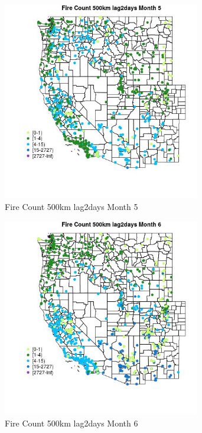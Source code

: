 \begin{figure} 
\centering  
\includegraphics[width=0.77\textwidth]{Code_Outputs/Report_ML_input_PM25_Step4_part_f_de_duplicated_aveswNAs_MapObsMo5Fire_Count_500km_lag2days.jpg} 
\caption{\label{fig:Report_ML_input_PM25_Step4_part_f_de_duplicated_aveswNAsMapObsMo5Fire_Count_500km_lag2days}Fire Count 500km lag2days Month 5} 
\end{figure} 
 

\clearpage 

\begin{figure} 
\centering  
\includegraphics[width=0.77\textwidth]{Code_Outputs/Report_ML_input_PM25_Step4_part_f_de_duplicated_aveswNAs_MapObsMo6Fire_Count_500km_lag2days.jpg} 
\caption{\label{fig:Report_ML_input_PM25_Step4_part_f_de_duplicated_aveswNAsMapObsMo6Fire_Count_500km_lag2days}Fire Count 500km lag2days Month 6} 
\end{figure} 
 

